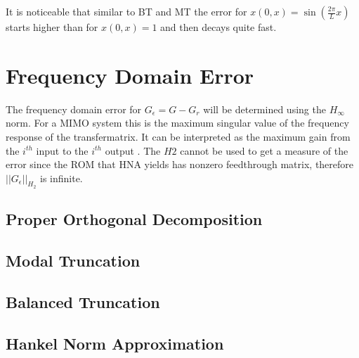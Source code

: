 It is noticeable that similar to BT and MT the error for \(x(0, x) = \sin(\frac{2\pi}{L}x)\) starts higher than for \(x(0, x) = 1\) and then decays quite fast.

\section{Frequency Domain Error}
The frequency domain error for \(G_{\epsilon }= G - G_r\) will be determined using the \(H_{\infty}\) norm.
For a MIMO system this is the maximum singular value of the frequency response of the transfermatrix.
It can be interpreted as the maximum gain from the \(i^{th}\) input to the \(i^{th}\) output \cite{eugenio}.
The \(H2\) cannot be used to get a measure of the error since the ROM that HNA yields has nonzero feedthrough matrix, therefore \(||G_{\epsilon}||_{H_{2}}\) is infinite. 
\subsection{Proper Orthogonal Decomposition}
\subsection{Modal Truncation}
\subsection{Balanced Truncation}
\subsection{Hankel Norm Approximation}




